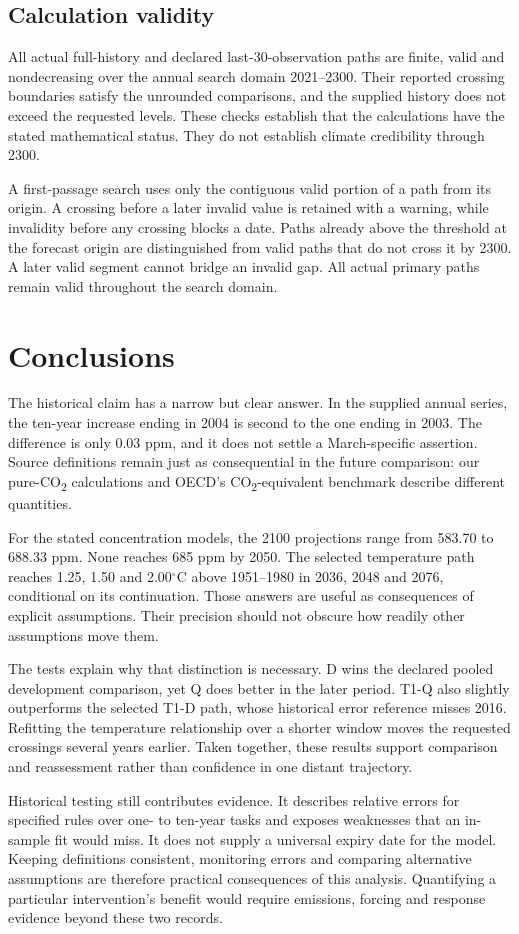 \documentclass[11pt,a4paper]{article}
\newcommand{\p}[2]{#2\par}
\newcommand{\CO}{CO\textsubscript{2}}
\newcommand{\degC}{\ensuremath{{}^{\circ}\mathrm{C}}}
\begin{document}
\subsection{Calculation validity}
\p{APP03}{All actual full-history and declared last-30-observation paths are finite, valid and nondecreasing over the annual search domain 2021--2300. Their reported crossing boundaries satisfy the unrounded comparisons, and the supplied history does not exceed the requested levels. These checks establish that the calculations have the stated mathematical status. They do not establish climate credibility through 2300.}
\p{APP04}{A first-passage search uses only the contiguous valid portion of a path from its origin. A crossing before a later invalid value is retained with a warning, while invalidity before any crossing blocks a date. Paths already above the threshold at the forecast origin are distinguished from valid paths that do not cross it by 2300. A later valid segment cannot bridge an invalid gap. All actual primary paths remain valid throughout the search domain.}
\section{Conclusions}\label{sec:conclusion}
\p{CON01}{The historical claim has a narrow but clear answer. In the supplied annual series, the ten-year increase ending in 2004 is second to the one ending in 2003. The difference is only 0.03 ppm, and it does not settle a March-specific assertion. Source definitions remain just as consequential in the future comparison: our pure-\CO{} calculations and OECD's \CO{}-equivalent benchmark describe different quantities.}
\p{CON02}{For the stated concentration models, the 2100 projections range from 583.70 to 688.33 ppm. None reaches 685 ppm by 2050. The selected temperature path reaches 1.25, 1.50 and 2.00\degC{} above 1951--1980 in 2036, 2048 and 2076, conditional on its continuation. Those answers are useful as consequences of explicit assumptions. Their precision should not obscure how readily other assumptions move them.}
\p{CON03}{The tests explain why that distinction is necessary. D wins the declared pooled development comparison, yet Q does better in the later period. T1-Q also slightly outperforms the selected T1-D path, whose historical error reference misses 2016. Refitting the temperature relationship over a shorter window moves the requested crossings several years earlier. Taken together, these results support comparison and reassessment rather than confidence in one distant trajectory.}
\p{CON04}{Historical testing still contributes evidence. It describes relative errors for specified rules over one- to ten-year tasks and exposes weaknesses that an in-sample fit would miss. It does not supply a universal expiry date for the model. Keeping definitions consistent, monitoring errors and comparing alternative assumptions are therefore practical consequences of this analysis. Quantifying a particular intervention's benefit would require emissions, forcing and response evidence beyond these two records.}
\clearpage
\end{document}
